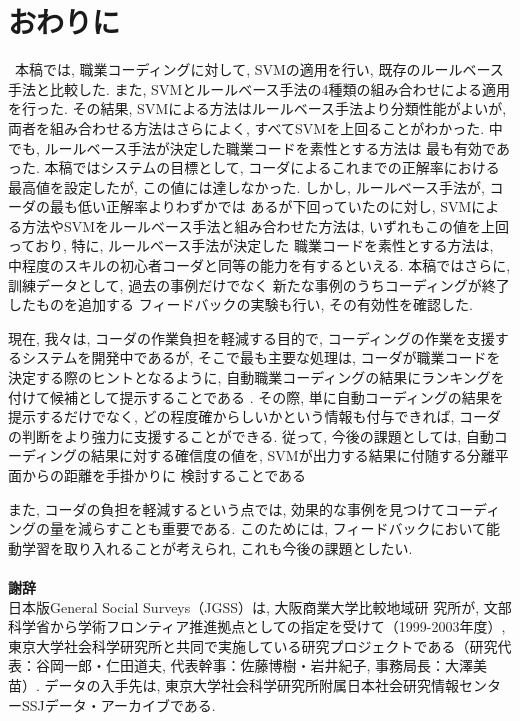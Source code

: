 \documentclass{nlp}
\begin{document}
\section{おわりに}\
本稿では, 職業コーディングに対して, 
SVMの適用を行い, 
既存のルールベース手法と比較した. 
また, SVMとルールベース手法の4種類の組み合わせによる適用を行った. 
その結果, 
SVMによる方法はルールベース手法より分類性能がよいが, 
両者を組み合わせる方法はさらによく, 
すべてSVMを上回ることがわかった. 
中でも, ルールベース手法が決定した職業コードを素性とする方法は
最も有効であった. 
本稿ではシステムの目標として, 
コーダによるこれまでの正解率における最高値を設定したが, 
この値には達しなかった. 
しかし, ルールベース手法が, コーダの最も低い正解率よりわずかでは
あるが下回っていたのに対し, 
SVMによる方法やSVMをルールベース手法と組み合わせた方法は, 
いずれもこの値を上回っており, 特に, 
ルールベース手法が決定した
職業コードを素性とする方法は, 
中程度のスキルの初心者コーダと同等の能力を有するといえる. 
本稿ではさらに, 訓練データとして, 過去の事例だけでなく
新たな事例のうちコーディングが終了したものを追加する
フィードバックの実験も行い, 
その有効性を確認した. 

現在, 我々は,  
コーダの作業負担を軽減する目的で, 
コーディングの作業を支援するシステムを開発中であるが, 
そこで最も主要な処理は, 
コーダが職業コードを決定する際のヒントとなるように, 
自動職業コーディングの結果にランキングを付けて候補として提示することである 
\cite{Takahashi_et_al04b}
. 
その際, 
単に自動コーディングの結果を提示するだけでなく, 
どの程度確からしいかという情報も付与できれば, 
コーダの判断をより強力に支援することができる. 
従って, 今後の課題としては,  
自動コーディングの結果に対する確信度の値を, 
SVMが出力する結果に付随する分離平面からの距離を手掛かりに
検討することである

また, 
コーダの負担を軽減するという点では, 
効果的な事例を見つけてコーディングの量を減らすことも重要である. 
このためには, 
フィードバックにおいて能動学習を取り入れることが考えられ, 
これも今後の課題としたい. \\\\
{\bf 謝辞}\\
{\small 日本版General Social Surveys（JGSS）は, 大阪商業大学比較地域研
究所が, 文部科学省から学術フロンティア推進拠点としての指定を受けて（1999-2003年度）, 東京大学社会科学研究所と共同で実施している研究プロジェクトである（研究代表：谷岡一郎・仁田道夫, 代表幹事：佐藤博樹・岩井紀子, 事務局長：大澤美苗）. データの入手先は, 東京大学社会科学研究所附属日本社会研究情報センターSSJデータ・アーカイブである. }
\end{document}

